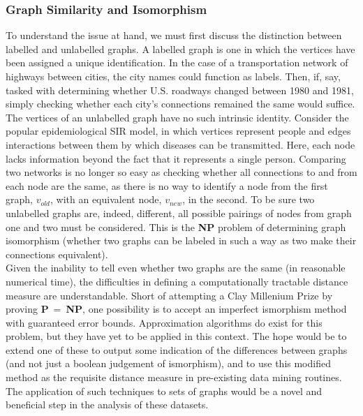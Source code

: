 \documentclass[11pt]{article}
\begin{document}
\subsubsection{Graph Similarity and Isomorphism}
To understand the issue at hand, we must first discuss the distinction between labelled and unlabelled graphs. A labelled graph is one in which the vertices have been assigned a unique identification. In the case of a transportation network of highways between cities, the city names could function as labels. Then, if, say, tasked with determining whether U.S. roadways changed between 1980 and 1981, simply checking whether each city's connections remained the same would suffice. The vertices of an unlabelled graph have no such intrinsic identity. Consider the popular epidemiological SIR model, in which vertices represent people and edges interactions between them by which diseases can be transmitted. Here, each node lacks information beyond the fact that it represents a single person. Comparing two networks is no longer so easy as checking whether all connections to and from each node are the same, as there is no way to identify a node from the first graph, $v_{old}$, with an equivalent node, $v_{new}$, in the second. To be sure two unlabelled graphs are, indeed, different, all possible pairings of nodes from graph one and two must be considered. This is the \textbf{NP} problem of determining graph isomorphism (whether two graphs can be labeled in such a way as two make their connections equivalent).\vspace{1mm}\\
Given the inability to tell even whether two graphs are the same (in reasonable numerical time), the difficulties in defining a computationally tractable distance measure are understandable. Short of attempting a Clay Millenium Prize by proving \textbf{P}$ \ = \ $\textbf{NP}, one possibility is to accept an imperfect ismorphism method with guaranteed error bounds. Approximation algorithms do exist for this problem, but they have yet to be applied in this context. The hope would be to extend one of these to output some indication of the differences between graphs (and not just a boolean judgement of ismorphism), and to use this modified method as the requisite distance measure in pre-existing data mining routines. The application of such techniques to sets of graphs would be a novel and beneficial step in the analysis of these datasets.
\end{document}
